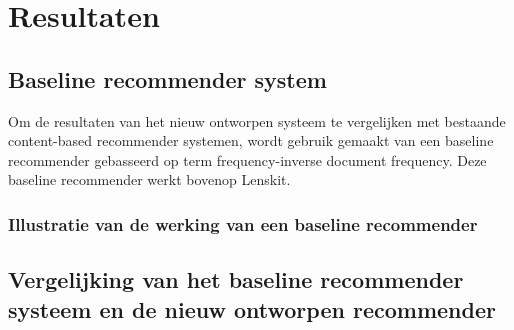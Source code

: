 \chapter{Resultaten}
\section{Baseline recommender system}
Om de resultaten van het nieuw ontworpen systeem te vergelijken met bestaande content-based recommender systemen, wordt gebruik gemaakt van een baseline recommender gebasseerd op term frequency-inverse document frequency. Deze baseline recommender werkt bovenop Lenskit.

\subsection{Illustratie van de werking van een baseline recommender}

\section{Vergelijking van het baseline recommender systeem en de nieuw ontworpen recommender}
